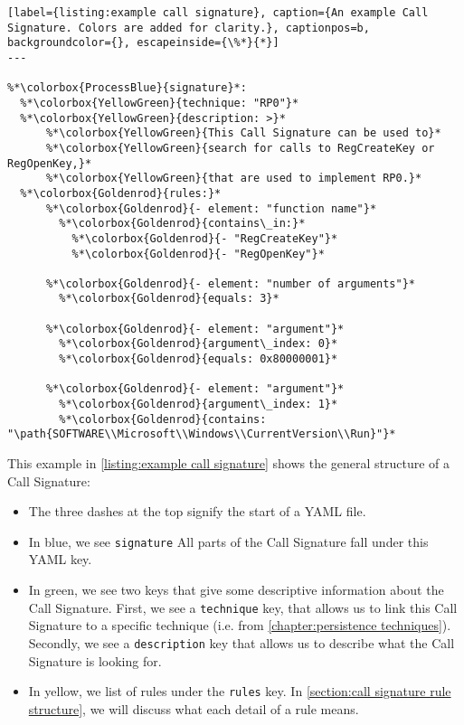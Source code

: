 \begin{minipage}{0.9\textwidth}
\begin{lstlisting}[label={listing:example call signature}, caption={An example Call Signature. Colors are added for clarity.}, captionpos=b, backgroundcolor={}, escapeinside={\%*}{*}]
---

%*\colorbox{ProcessBlue}{signature}*:
  %*\colorbox{YellowGreen}{technique: "RP0"}*
  %*\colorbox{YellowGreen}{description: >}*
      %*\colorbox{YellowGreen}{This Call Signature can be used to}*
      %*\colorbox{YellowGreen}{search for calls to RegCreateKey or RegOpenKey,}*
      %*\colorbox{YellowGreen}{that are used to implement RP0.}*
  %*\colorbox{Goldenrod}{rules:}*
      %*\colorbox{Goldenrod}{- element: "function name"}*
        %*\colorbox{Goldenrod}{contains\_in:}*
          %*\colorbox{Goldenrod}{- "RegCreateKey"}*
          %*\colorbox{Goldenrod}{- "RegOpenKey"}*

      %*\colorbox{Goldenrod}{- element: "number of arguments"}*
        %*\colorbox{Goldenrod}{equals: 3}*

      %*\colorbox{Goldenrod}{- element: "argument"}*
        %*\colorbox{Goldenrod}{argument\_index: 0}*
        %*\colorbox{Goldenrod}{equals: 0x80000001}*

      %*\colorbox{Goldenrod}{- element: "argument"}*
        %*\colorbox{Goldenrod}{argument\_index: 1}*
        %*\colorbox{Goldenrod}{contains: "\path{SOFTWARE\\Microsoft\\Windows\\CurrentVersion\\Run}"}*
\end{lstlisting}
\end{minipage}

This example in \autoref{listing:example call signature} shows the general structure of a Call Signature:
\begin{itemize}
  \item The three dashes at the top signify the start of a YAML file.

  \item In blue, we see \texttt{signature} All parts of the Call Signature fall under this YAML key.

  \item In green, we see two keys that give some descriptive information about the Call Signature. First, we see a \texttt{technique} key, that allows us to link this Call Signature to a specific technique (i.e. from \autoref{chapter:persistence techniques}). Secondly, we see a \texttt{description} key that allows us to describe what the Call Signature is looking for.

  \item In yellow, we list of rules under the \texttt{rules} key. In \autoref{section:call signature rule structure}, we will discuss what each detail of a rule means.
\end{itemize}

